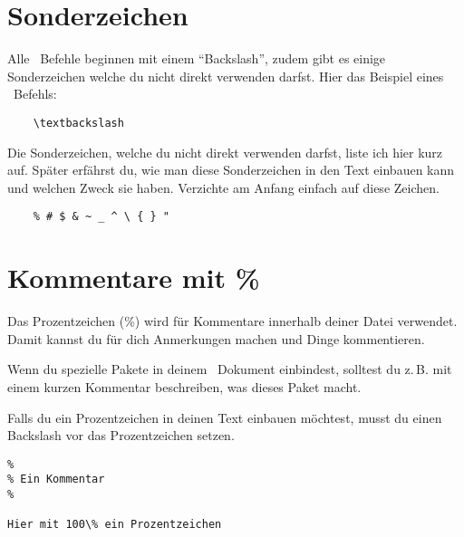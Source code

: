 
\section{Sonderzeichen}
\label{Sonderzeichen}

Alle \DMLLaTeX \ Befehle beginnen mit einem \enquote{Backslash}, zudem gibt es einige Sonderzeichen welche du nicht direkt verwenden darfst. Hier das Beispiel eines
\DMLLaTeX \ Befehls:

\begin{lstlisting}
	\textbackslash
\end{lstlisting}

Die Sonderzeichen, welche du nicht direkt verwenden darfst, liste ich hier kurz auf. Später erfährst du, wie man diese Sonderzeichen in den Text einbauen kann und welchen Zweck sie haben. Verzichte am Anfang einfach auf diese Zeichen.

\begin{lstlisting}
	% # $ & ~ _ ^ \ { } "
\end{lstlisting}

\section{Kommentare mit \%}

Das Prozentzeichen (\%) wird für Kommentare innerhalb deiner Datei verwendet. Damit kannst du für dich Anmerkungen machen und Dinge kommentieren. 

Wenn du spezielle Pakete in deinem \DMLLaTeX \ Dokument einbindest, solltest du z.\,B. mit einem kurzen Kommentar beschreiben, was dieses Paket macht.

Falls du ein Prozentzeichen in deinen Text einbauen möchtest, musst du einen Backslash vor das Prozentzeichen setzen.

\begin{lstlisting}
%
% Ein Kommentar
%

Hier mit 100\% ein Prozentzeichen
\end{lstlisting}



